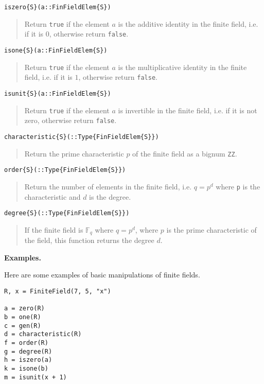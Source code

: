 \documentclass[a4paper,10pt]{article}
\newcommand{\F}{\mathbb{F}}
\newcommand{\code}{\lstinline}
\newcommand{\desc}[1]{\vspace{-3mm}\begin{quote}#1\end{quote}}
\begin{document}
{{\begin{lstlisting}
iszero{S}(a::FinFieldElem{S})
\end{lstlisting}

\desc{Return \code{true} if the element $a$ is the additive identity in the
finite field, i.e. if it is $0$, otherwise return \code{false}.}

\begin{lstlisting}
isone{S}(a::FinFieldElem{S})
\end{lstlisting}

\desc{Return \code{true} if the element $a$ is the multiplicative identity in
the finite field, i.e. if it is $1$, otherwise return \code{false}.}

\begin{lstlisting}
isunit{S}(a::FinFieldElem{S})
\end{lstlisting}

\desc{Return \code{true} if the element $a$ is invertible in the finite field,
i.e. if it is not zero, otherwise return \code{false}.}

\begin{lstlisting}
characteristic{S}(::Type{FinFieldElem{S}})
\end{lstlisting}

\desc{Return the prime characteristic $p$ of the finite field as a bignum
\code{ZZ}.}

\begin{lstlisting}
order{S}(::Type{FinFieldElem{S}})
\end{lstlisting}

\desc{Return the number of elements in the finite field, i.e. $q = p^d$
where \code{p} is the characteristic and $d$ is the degree.}

\begin{lstlisting}
degree{S}(::Type{FinFieldElem{S}})
\end{lstlisting}

\desc{If the finite field is $\F_q$ where $q = p^d$, where $p$ is the
prime characteristic of the field, this function returns the degree
$d$.}

\textbf{Examples.}

Here are some examples of basic manipulations of finite fields.

\begin{lstlisting}
R, x = FiniteField(7, 5, "x")

a = zero(R)
b = one(R)
c = gen(R)
d = characteristic(R)
f = order(R)
g = degree(R)
h = iszero(a)
k = isone(b)
m = isunit(x + 1)
\end{lstlisting}

}}
\end{document}
